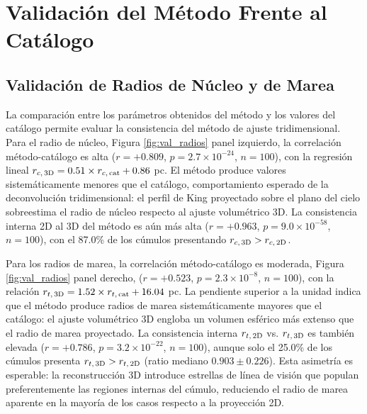     \section{Validación del Método Frente al Catálogo}
        \subsection{Validación de Radios de Núcleo y de Marea}
            La comparación entre los parámetros obtenidos del método y los 
            valores del catálogo permite evaluar la consistencia del método de 
            ajuste tridimensional. Para el radio de núcleo, Figura 
            \ref{fig:val_radios} panel izquierdo, la correlación método-catálogo 
            es alta ($r = +0.809$, $p = 2.7 \times 10^{-24}$, $n = 100$), con la 
            regresión lineal $r_{c,\, 3{\rm D}} = 0.51 \times 
            r_{c,\, {\rm cat}} + 0.86$ pc. El método produce valores 
            sistemáticamente menores que el catálogo, comportamiento esperado de 
            la deconvolución tridimensional: el perfil de King proyectado sobre 
            el plano del cielo sobreestima el radio de núcleo respecto al ajuste 
            volumétrico 3D. La consistencia interna 2D al 3D del método es aún 
            más alta ($r = +0.963$, $p = 9.0 \times 10^{-58}$, $n = 100$), con 
            el 87.0\% de los cúmulos presentando $r_{c,\, 3{\rm D}} > 
            r_{c,\, 2{\rm D}}$.

            Para los radios de marea, la correlación método-catálogo es 
            moderada, Figura \ref{fig:val_radios} panel derecho, 
            ($r = +0.523$, $p = 2.3 \times 10^{-8}$, $n = 100$), con la relación 
            $r_{t,\, 3{\rm D}} = 1.52 \times r_{t,\, {\rm cat}} + 16.04$ pc. La 
            pendiente superior a la unidad indica que el método produce radios 
            de marea sistemáticamente mayores que el catálogo: el ajuste 
            volumétrico 3D engloba un volumen esférico más extenso que el radio 
            de marea proyectado. La consistencia interna $r_{t,\, 2{\rm D}}$ vs. 
            $r_{t,\, 3{\rm D}}$ es también elevada ($r = +0.786$, $p = 3.2 
            \times 10^{-22}$, $n = 100$), aunque solo el 25.0\% de los cúmulos 
            presenta $r_{t,\, 3{\rm D}} > r_{t,\, 2{\rm D}}$ (ratio mediano 
            $0.903 \pm 0.226$). Esta asimetría es esperable: la reconstrucción 
            3D introduce estrellas de línea de visión que populan 
            preferentemente las regiones internas del cúmulo, reduciendo el 
            radio de marea aparente en la mayoría de los casos respecto a la 
            proyección 2D.


